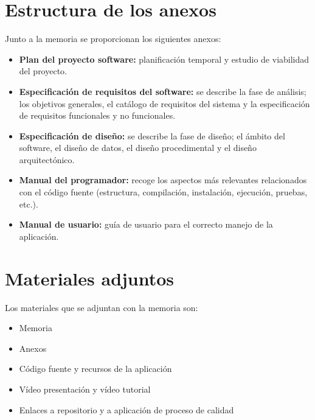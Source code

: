 \section{Estructura de los anexos}
Junto a la memoria se proporcionan los siguientes anexos:
\begin{itemize}
    \item \textbf{Plan del proyecto software: }planificación temporal y estudio de viabilidad del proyecto.
    \item \textbf{Especificación de requisitos del software: }se describe la fase de análisis; los objetivos generales, el catálogo de requisitos del sistema y la especificación de requisitos funcionales y no funcionales.
    \item \textbf{Especificación de diseño: }se describe la fase de diseño; el ámbito del software, el diseño de datos, el diseño procedimental y el diseño arquitectónico.
    \item \textbf{Manual del programador: }recoge los aspectos más relevantes relacionados con el código fuente (estructura, compilación, instalación, ejecución, pruebas, etc.).
    \item \textbf{Manual de usuario: }guía de usuario para el correcto manejo de la aplicación.
\end{itemize}

\section{Materiales adjuntos}

Los materiales que se adjuntan con la memoria son:

\begin{itemize}
    \item Memoria
    \item Anexos
    \item Código fuente y recursos de la aplicación
    \item Vídeo presentación y vídeo tutorial
    \item Enlaces a repositorio y a aplicación de proceso de calidad
\end{itemize}